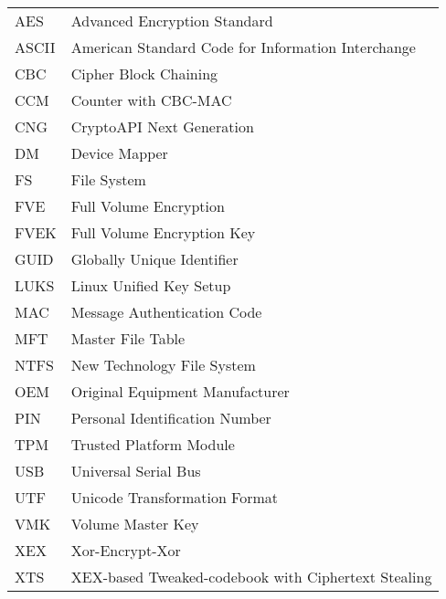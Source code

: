 
\seznamzkr

\begin{tabular}{ll}
  AES & Advanced Encryption Standard \\
  ASCII & American Standard Code for Information Interchange \\
  CBC & Cipher Block Chaining \\
  CCM & Counter with CBC-MAC \\
  CNG & CryptoAPI Next Generation \\
  DM & Device Mapper \\
  FS &  File System \\
  FVE & Full Volume Encryption \\
  FVEK & Full Volume Encryption Key \\
  GUID & Globally Unique Identifier \\
  LUKS & Linux Unified Key Setup \\
  MAC & Message Authentication Code \\
  MFT & Master File Table \\
  NTFS & New Technology File System \\
  OEM & Original Equipment Manufacturer \\
  PIN & Personal Identification Number \\
  TPM & Trusted Platform Module \\
  USB & Universal Serial Bus \\
  UTF & Unicode Transformation Format \\
  VMK & Volume Master Key \\
  XEX & Xor-Encrypt-Xor \\
  XTS & XEX-based Tweaked-codebook with Ciphertext Stealing \\
\end{tabular}

